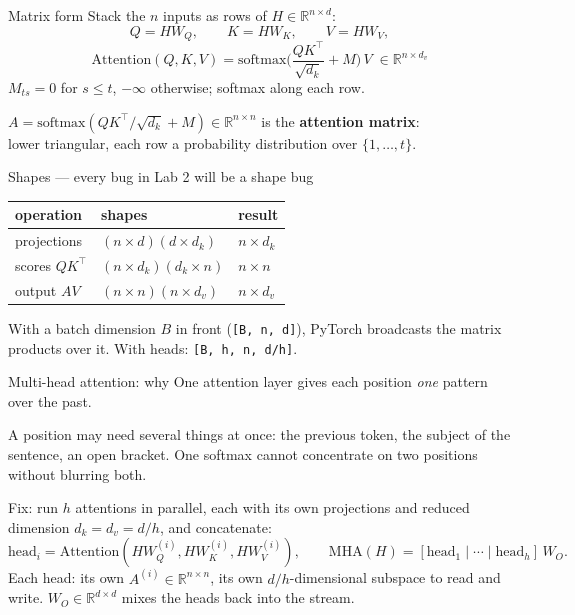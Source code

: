 \documentclass[11pt,aspectratio=169]{beamer}
\newcommand{\R}{\mathbb{R}}
\newcommand{\sm}{\mathrm{softmax}}
\newcommand{\MHA}{\mathrm{MHA}}
\newcommand{\T}{^{\top}}
\newcommand{\dest}[1]{\textcolor{structure}{\textbf{#1}}}
\begin{document}
\begin{frame}{Matrix form}
  Stack the $n$ inputs as rows of $H\in\R^{n\times d}$:
  \[
    Q = HW_Q,\qquad K = HW_K,\qquad V = HW_V,
  \]
  \[
    \boxed{\;\mathrm{Attention}(Q,K,V) = \sm\!\Big(\frac{QK\T}{\sqrt{d_k}} + M\Big)\,V
    \;\in\R^{n\times d_v}\;}
  \]
  $M_{ts} = 0$ for $s\le t$, $-\infty$ otherwise; softmax along each row.

  \vspace{0.8em}
  $A = \sm(QK\T/\sqrt{d_k} + M)\in\R^{n\times n}$ is the \dest{attention matrix}:\\
  lower triangular, each row a probability distribution over $\{1,\dots,t\}$.
\end{frame}

\begin{frame}{Shapes --- every bug in Lab 2 will be a shape bug}
  \begin{center}
  \begin{tabular}{@{}lll@{}}
    \toprule
    operation & shapes & result \\
    \midrule
    projections & $(n\times d)(d\times d_k)$ & $n\times d_k$ \\
    scores $QK\T$ & $(n\times d_k)(d_k\times n)$ & $n\times n$ \\
    output $AV$ & $(n\times n)(n\times d_v)$ & $n\times d_v$ \\
    \bottomrule
  \end{tabular}
  \end{center}

  \vspace{1em}
  With a batch dimension $B$ in front (\texttt{[B, n, d]}), PyTorch broadcasts the matrix
  products over it. With heads: \texttt{[B, h, n, d/h]}.
\end{frame}

\begin{frame}{Multi-head attention: why}
  One attention layer gives each position \emph{one} pattern over the past.

  \vspace{0.6em}
  A position may need several things at once: the previous token, the subject of the
  sentence, an open bracket. One softmax cannot concentrate on two positions without
  blurring both.

  \vspace{0.8em}
  Fix: run $h$ attentions in parallel, each with its own projections and reduced
  dimension $d_k = d_v = d/h$, and concatenate:
  \[
    \mathrm{head}_i = \mathrm{Attention}(HW_Q^{(i)}, HW_K^{(i)}, HW_V^{(i)}),\qquad
    \MHA(H) = [\mathrm{head}_1\mid\cdots\mid\mathrm{head}_h]\,W_O .
  \]
  Each head: its own $A^{(i)}\in\R^{n\times n}$, its own $d/h$-dimensional subspace to read
  and write. $W_O\in\R^{d\times d}$ mixes the heads back into the stream.
\end{frame}
\end{document}
